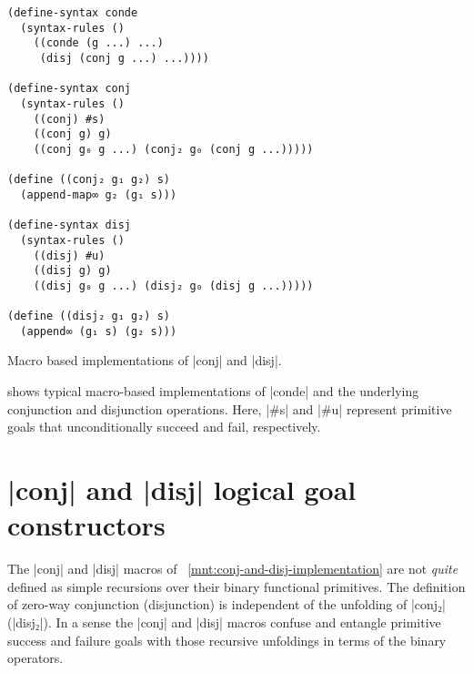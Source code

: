 \documentclass[sigplan,screen,draft,anonymous,review,natbib=false]{acmart}
\begin{document}

\begin{listing}
  \begin{verbatim}
(define-syntax conde
  (syntax-rules ()
    ((conde (g ...) ...)
     (disj (conj g ...) ...))))

(define-syntax conj
  (syntax-rules ()
    ((conj) #s)
    ((conj g) g)
    ((conj g₀ g ...) (conj₂ g₀ (conj g ...)))))

(define ((conj₂ g₁ g₂) s)
  (append-map∞ g₂ (g₁ s)))

(define-syntax disj
  (syntax-rules ()
    ((disj) #u)
    ((disj g) g)
    ((disj g₀ g ...) (disj₂ g₀ (disj g ...)))))

(define ((disj₂ g₁ g₂) s)
  (append∞ (g₁ s) (g₂ s)))
  \end{verbatim}
  \caption{Macro based implementations of \rackinline|conj| and \rackinline|disj|.}
  \label{mnt:conj-and-disj-implementation}
\end{listing}

 shows typical macro-based
implementations of \rackinline|conde| and the underlying conjunction
and disjunction operations. Here, \rackinline|#s| and \rackinline|#u|
represent primitive goals that unconditionally succeed and fail,
respectively.

\section{\rackinline|conj| and \rackinline|disj| logical goal
  constructors}\label{sec:conde}

The \rackinline|conj| and \rackinline|disj| macros of
~\cref{mnt:conj-and-disj-implementation} are not \emph{quite} defined
as simple recursions over their binary functional primitives. The
definition of zero-way conjunction (disjunction) is independent of the
unfolding of \rackinline|conj₂| (\rackinline|disj₂|). In a sense the
\rackinline|conj| and \rackinline|disj| macros confuse and entangle
primitive success and failure goals with those recursive unfoldings in
terms of the binary operators.
\end{document}
